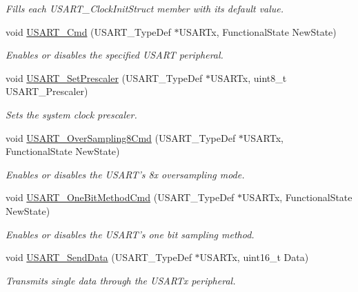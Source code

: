 \begin{DoxyCompactItemize}
\begin{DoxyCompactList}\small\item\em Fills each U\-S\-A\-R\-T\-\_\-\-Clock\-Init\-Struct member with its default value. \end{DoxyCompactList}\item 
void \hyperlink{group___u_s_a_r_t_ga45e51626739c5f22a6567c8a85d1d85e}{U\-S\-A\-R\-T\-\_\-\-Cmd} (U\-S\-A\-R\-T\-\_\-\-Type\-Def $\ast$U\-S\-A\-R\-Tx, Functional\-State New\-State)
\begin{DoxyCompactList}\small\item\em Enables or disables the specified U\-S\-A\-R\-T peripheral. \end{DoxyCompactList}\item 
void \hyperlink{group___u_s_a_r_t_gaf5da8f2eee8245425584d85d4f62cc33}{U\-S\-A\-R\-T\-\_\-\-Set\-Prescaler} (U\-S\-A\-R\-T\-\_\-\-Type\-Def $\ast$U\-S\-A\-R\-Tx, uint8\-\_\-t U\-S\-A\-R\-T\-\_\-\-Prescaler)
\begin{DoxyCompactList}\small\item\em Sets the system clock prescaler. \end{DoxyCompactList}\item 
void \hyperlink{group___u_s_a_r_t_ga3897bab07491d9239f8a238a9a7cddea}{U\-S\-A\-R\-T\-\_\-\-Over\-Sampling8\-Cmd} (U\-S\-A\-R\-T\-\_\-\-Type\-Def $\ast$U\-S\-A\-R\-Tx, Functional\-State New\-State)
\begin{DoxyCompactList}\small\item\em Enables or disables the U\-S\-A\-R\-T's 8x oversampling mode. \end{DoxyCompactList}\item 
void \hyperlink{group___u_s_a_r_t_ga3ed89ea8765d851510cfe90f7d90cbbb}{U\-S\-A\-R\-T\-\_\-\-One\-Bit\-Method\-Cmd} (U\-S\-A\-R\-T\-\_\-\-Type\-Def $\ast$U\-S\-A\-R\-Tx, Functional\-State New\-State)
\begin{DoxyCompactList}\small\item\em Enables or disables the U\-S\-A\-R\-T's one bit sampling method. \end{DoxyCompactList}\item 
void \hyperlink{group___u_s_a_r_t_ga0b43d42da9540f446d494bf69823c6fb}{U\-S\-A\-R\-T\-\_\-\-Send\-Data} (U\-S\-A\-R\-T\-\_\-\-Type\-Def $\ast$U\-S\-A\-R\-Tx, uint16\-\_\-t Data)
\begin{DoxyCompactList}\small\item\em Transmits single data through the U\-S\-A\-R\-Tx peripheral. \end{DoxyCompactList}\item 

\end{DoxyCompactItemize}
